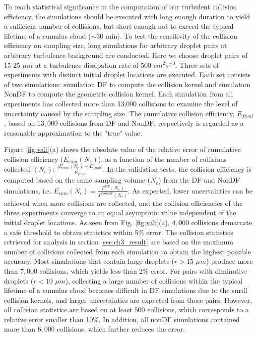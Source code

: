 To reach statistical significance in the computation of our turbulent collision efficiency, the simulations should be executed with long enough duration to yield a sufficient number of collisions, but short enough not to exceed the typical lifetime of a cumulus cloud ($\sim 30$ min). To test the sensitivity of the collision efficiency on sampling size, long simulations for arbitrary droplet pairs at arbitrary turbulence background are conducted. Here we choose droplet pairs of 15-25 $\mu m$ at a turbulence dissipation rate of 500 $cm^2s^{-3}$. Three sets of experiments with distinct initial droplet locations are executed. Each set consists of two simulations: simulation DF to compute the collision kernel and simulation NonDF to compute the geometric collision kernel. Each simulation from all experiments has collected more than 13,000 collisions to examine the level of uncertainty caused by the sampling size. The cumulative collision efficiency, $E_{final}$, based on $13,000$ collisions from DF and NonDF, respectively is regarded as a reasonable approximation to the "true" value. 



Figure \ref{fig:vali}(a) shows the absolute value of the relative error of cumulative collision efficiency ($E_{cum} (N_c )$), as a function of the number of collisions collected $(N_c)$: $\frac{|E_{cum}(N_c)-E_{final}|}{E_{final}}$. In the validation tests, the collision efficiency is computed based on the same sampling volume ($N_c$) from the DF and NonDF simulations, i.e. $E_{cum} (N_c) =\frac{\Gamma^{DF} (N_c)}{\Gamma^{NonDF} (N_c)}$. As expected, lower uncertainties can be achieved when more collisions are collected, and the collision efficiencies of the three experiments converge to an equal asymptotic value independent of the initial droplet locations. As seen from Fig. \ref{fig:vali}(a), $4,000$ collisions demarcate a safe threshold to obtain statistics within 5\% error. The collision statistics retrieved for analysis in section \ref{sec:ch3_result} are based on the maximum number of collisions collected from each simulation to obtain the highest possible accuracy. Most simulations that contain large droplets ($r > 15$ $\mu m$) produce more than $7,000$ collisions, which yields less than 2\% error. For pairs with diminutive droplets ($r < 10$ $\mu m$), collecting a large number of collisions within the typical lifetime of a cumulus cloud becomes difficult in DF simulations due to the small collision kernels, and larger uncertainties are expected from those pairs. However, all collision statistics are based on at least 500 collisions, which corresponds to a relative error smaller than 10\%. In addition, all nonDF simulations contained more than $6,000$ collisions, which further reduces the error.  

